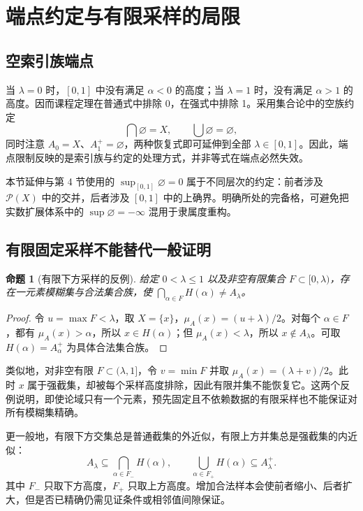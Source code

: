 \documentclass[UTF8,fontset=fandol,zihao=-4,a4paper]{ctexart}
\numberwithin{equation}{section}
\theoremstyle{reportplain}
\newtheorem{proposition}[theorem]{命题}
\newcommand{\Pow}{\mathcal P}
\newcommand{\muA}{\mu_A}
\newcommand{\cut}[1]{A_{#1}}
\newcommand{\scut}[1]{A_{#1}^{+}}
\newcommand{\set}[1]{\{#1\}}
\newcommand{\eqtag}[1]{\label{#1}}
\begin{document}
\section{端点约定与有限采样的局限}\label{sec:endpoints}
\subsection{空索引族端点}
当 $\lambda=0$ 时，$[0,1]$ 中没有满足 $\alpha<0$ 的高度；当 $\lambda=1$ 时，没有满足 $\alpha>1$ 的高度。因而课程定理在普通式中排除 0，在强式中排除 1。采用集合论中的空族约定
\begin{equation}
\bigcap\varnothing=X,\qquad\bigcup\varnothing=\varnothing,
\eqtag{eq:empty}
\end{equation}
同时注意 $\cut0=X$、$\scut1=\varnothing$，两种恢复式即可延伸到全部 $\lambda\in[0,1]$。因此，端点限制反映的是索引族与约定的处理方式，并非等式在端点必然失效。

本节延伸与第 4 节使用的 $\sup_{[0,1]}\varnothing=0$ 属于不同层次的约定：前者涉及 $\Pow(X)$ 中的交并，后者涉及 $[0,1]$ 中的上确界。明确所处的完备格，可避免把实数扩展体系中的 $\sup\varnothing=-\infty$ 混用于隶属度重构。

\subsection{有限固定采样不能替代一般证明}
\begin{proposition}[有限下方采样的反例]
给定 $0<\lambda\le1$ 以及非空有限集合 $F\subset[0,\lambda)$，存在一元素模糊集与合法集合族，使 $\bigcap_{\alpha\in F}H(\alpha)\ne\cut{\lambda}$。
\end{proposition}
\begin{proof}
令 $u=\max F<\lambda$，取 $X=\set{x}$，$\muA(x)=(u+\lambda)/2$。对每个 $\alpha\in F$，都有 $\muA(x)>\alpha$，所以 $x\in H(\alpha)$；但 $\muA(x)<\lambda$，所以 $x\notin\cut{\lambda}$。可取 $H(\alpha)=\scut{\alpha}$ 为具体合法集合族。\end{proof}

类似地，对非空有限 $F\subset(\lambda,1]$，令 $v=\min F$ 并取 $\muA(x)=(\lambda+v)/2$。此时 $x$ 属于强截集，却被每个采样高度排除，因此有限并集不能恢复它。这两个反例说明，即使论域只有一个元素，预先固定且不依赖数据的有限采样也不能保证对所有模糊集精确。

更一般地，有限下方交集总是普通截集的外近似，有限上方并集总是强截集的内近似：
\begin{equation}
\cut{\lambda}\subseteq\bigcap_{\alpha\in F_-}H(\alpha),
\qquad
\bigcup_{\alpha\in F_+}H(\alpha)\subseteq\scut{\lambda}.
\eqtag{eq:sample-bound}
\end{equation}
其中 $F_-$ 只取下方高度，$F_+$ 只取上方高度。增加合法样本会使前者缩小、后者扩大，但是否已精确仍需见证条件或相邻值间隙保证。
\end{document}

